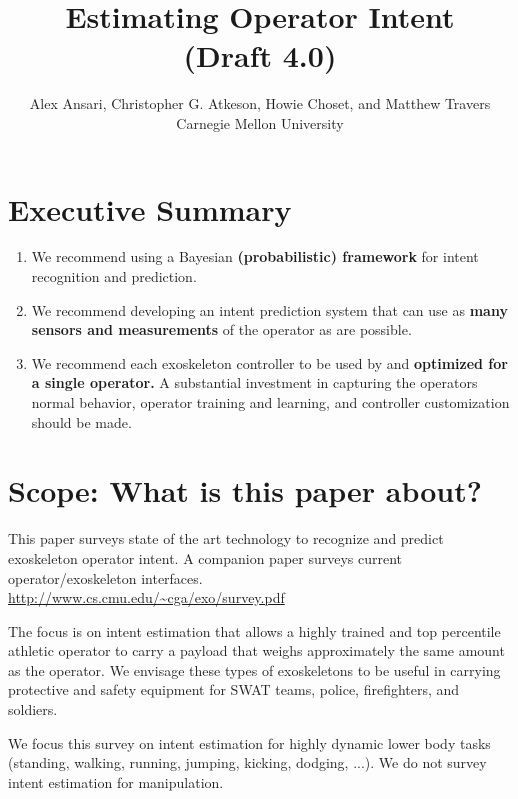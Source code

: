 \documentclass[letterpaper,12pt,fullpage]{article}
\begin{document}
\title{Estimating Operator Intent\\
(Draft 4.0)}

\author{Alex Ansari, Christopher G. Atkeson, Howie Choset, and Matthew Travers\\
Carnegie Mellon University}

\maketitle

\section{Executive Summary}

\begin{enumerate}
\item
We recommend using a Bayesian {\bf (probabilistic) framework}
for intent recognition and prediction.
\item
We recommend developing an intent prediction system that can use
as {\bf many sensors and measurements} of the operator as are possible.
\item
We recommend each exoskeleton controller
to be used by and {\bf optimized for a single operator.}
A substantial investment in capturing the operators normal behavior,
operator training and learning, and controller customization should be made.
\end{enumerate}

\section{Scope: What is this paper about?}

This paper surveys state of the art technology to recognize
and predict exoskeleton
operator intent.
A companion paper surveys current operator/exoskeleton interfaces.\\
\url{http://www.cs.cmu.edu/~cga/exo/survey.pdf}

The focus is on intent estimation that allows a
highly trained and top percentile athletic 
operator to carry a payload that weighs approximately the same amount
as the operator. We envisage these types of exoskeletons to be useful
in carrying protective and safety equipment for SWAT teams, police,
firefighters, and soldiers. 

We focus this survey on intent estimation for highly dynamic 
lower body tasks (standing, walking,
running, jumping, kicking, dodging, ...).
We do not survey intent estimation for manipulation. 
\end{document}
